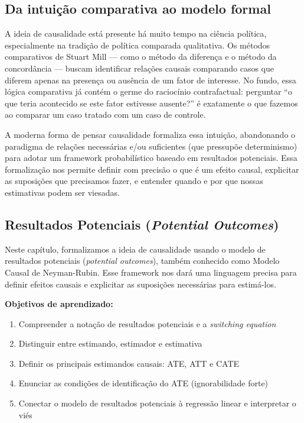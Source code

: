 \documentclass[
]{article}
\providecommand{\tightlist}{%
  \setlength{\itemsep}{0pt}\setlength{\parskip}{0pt}}
\begin{document}
\subsection{Da intuição comparativa ao modelo formal}\label{da-intuiuxe7uxe3o-comparativa-ao-modelo-formal}

A ideia de causalidade está presente há muito tempo na ciência política, especialmente na tradição de política comparada qualitativa. Os métodos comparativos de Stuart Mill --- como o método da diferença e o método da concordância --- buscam identificar relações causais comparando casos que diferem apenas na presença ou ausência de um fator de interesse. No fundo, essa lógica comparativa já contém o germe do raciocínio contrafactual: perguntar ``o que teria acontecido se este fator estivesse ausente?'' é exatamente o que fazemos ao comparar um caso tratado com um caso de controle.

A moderna forma de pensar causalidade formaliza essa intuição, abandonando o paradigma de relações necessárias e/ou suficientes (que pressupõe determinismo) para adotar um framework probabilístico baseado em resultados potenciais. Essa formalização nos permite definir com precisão o que é um efeito causal, explicitar as suposições que precisamos fazer, e entender quando e por que nossas estimativas podem ser viesadas.

\subsection{\texorpdfstring{Resultados Potenciais (\emph{Potential Outcomes})}{Resultados Potenciais (Potential Outcomes)}}\label{resultados-potenciais-potential-outcomes}

Neste capítulo, formalizamos a ideia de causalidade usando o modelo de resultados potenciais (\emph{potential outcomes}), também conhecido como Modelo Causal de Neyman-Rubin. Esse framework nos dará uma linguagem precisa para definir efeitos causais e explicitar as suposições necessárias para estimá-los.

\textbf{Objetivos de aprendizado:}

\begin{enumerate}
\def\labelenumi{\arabic{enumi}.}
\tightlist
\item
  Compreender a notação de resultados potenciais e a \emph{switching equation}
\item
  Distinguir entre estimando, estimador e estimativa
\item
  Definir os principais estimandos causais: ATE, ATT e CATE
\item
  Enunciar as condições de identificação do ATE (ignorabilidade forte)
\item
  Conectar o modelo de resultados potenciais à regressão linear e interpretar o viés
\end{enumerate}
\end{document}
